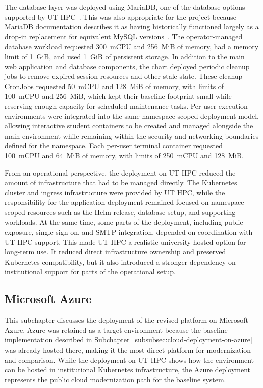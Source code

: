 The database layer was deployed using MariaDB, one of the database options supported by UT HPC~\cite{ut_hpc_kubernetes_databases_2025}.
This was also appropriate for the project because MariaDB documentation describes it as having historically functioned largely as a drop-in replacement for equivalent MySQL versions~\cite{mariadb_mysql_compatibility}.
The operator-managed database workload requested 300~mCPU and 256~MiB of memory, had a memory limit of 1~GiB, and used 1~GiB of persistent storage.
In addition to the main web application and database components, the chart deployed periodic cleanup jobs to remove expired session resources and other stale state.
These cleanup CronJobs requested 50~mCPU and 128~MiB of memory, with limits of 100~mCPU and 256~MiB, which kept their baseline footprint small while reserving enough capacity for scheduled maintenance tasks.
Per-user execution environments were integrated into the same namespace-scoped deployment model, allowing interactive student containers to be created and managed alongside the main environment while remaining within the security and networking boundaries defined for the namespace.
Each per-user terminal container requested 100~mCPU and 64~MiB of memory, with limits of 250~mCPU and 128~MiB\@.

From an operational perspective, the deployment on UT HPC reduced the amount of infrastructure that had to be managed directly.
The Kubernetes cluster and ingress infrastructure were provided by UT HPC, while the responsibility for the application deployment remained focused on namespace-scoped resources such as the Helm release, database setup, and supporting workloads.
At the same time, some parts of the deployment, including public exposure, single sign-on, and SMTP integration, depended on coordination with UT HPC support.
This made UT HPC a realistic university-hosted option for long-term use.
It reduced direct infrastructure ownership and preserved Kubernetes compatibility, but it also introduced a stronger dependency on institutional support for parts of the operational setup.

\subsection{Microsoft Azure} \label{subsec:microsoft-azure}
This subchapter discusses the deployment of the revised platform on Microsoft Azure.
Azure was retained as a target environment because the baseline implementation described in Subchapter~\ref{subsubsec:cloud-deployment-on-azure} was already hosted there, making it the most direct platform for modernization and comparison.
While the deployment on UT HPC shows how the environment can be hosted in institutional Kubernetes infrastructure, the Azure deployment represents the public cloud modernization path for the baseline system.

